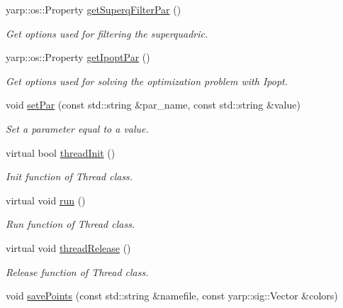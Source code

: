 \begin{DoxyCompactItemize}
yarp\+::os\+::\+Property \mbox{\hyperlink{classSuperqComputation_a1f93a7688ef418d2ca9402cff5621048}{get\+Superq\+Filter\+Par}} ()
\begin{DoxyCompactList}\small\item\em Get options used for filtering the superquadric. \end{DoxyCompactList}\item 
yarp\+::os\+::\+Property \mbox{\hyperlink{classSuperqComputation_a1d95dee395edafac26144758f3bd5830}{get\+Ipopt\+Par}} ()
\begin{DoxyCompactList}\small\item\em Get options used for solving the optimization problem with Ipopt. \end{DoxyCompactList}\item 
void \mbox{\hyperlink{classSuperqComputation_a1780009371c09327b8491189dee66b20}{set\+Par}} (const std\+::string \&par\+\_\+name, const std\+::string \&value)
\begin{DoxyCompactList}\small\item\em Set a parameter equal to a value. \end{DoxyCompactList}\item 
\mbox{\label{classSuperqComputation_ada608220b124f8ffcf458d93bad4f227}} 
virtual bool \mbox{\hyperlink{classSuperqComputation_ada608220b124f8ffcf458d93bad4f227}{thread\+Init}} ()
\begin{DoxyCompactList}\small\item\em Init function of Thread class. \end{DoxyCompactList}\item 
\mbox{\label{classSuperqComputation_a4a4ac55200a7633a2384da0f0d945ba9}} 
virtual void \mbox{\hyperlink{classSuperqComputation_a4a4ac55200a7633a2384da0f0d945ba9}{run}} ()
\begin{DoxyCompactList}\small\item\em Run function of Thread class. \end{DoxyCompactList}\item 
\mbox{\label{classSuperqComputation_a9e9646fce399266221fb87bc1e1c2476}} 
virtual void \mbox{\hyperlink{classSuperqComputation_a9e9646fce399266221fb87bc1e1c2476}{thread\+Release}} ()
\begin{DoxyCompactList}\small\item\em Release function of Thread class. \end{DoxyCompactList}\item 
void \mbox{\hyperlink{classSuperqComputation_ab8912bb805cf979007985ffb553d43b0}{save\+Points}} (const std\+::string \&namefile, const yarp\+::sig\+::\+Vector \&colors)

\end{DoxyCompactItemize}

